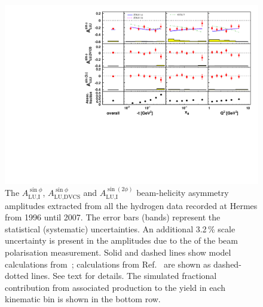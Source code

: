 \begin{figure}
 \begin{center}
 \includegraphics[width=15cm]{macros/morgan_change}
  \caption{The $A_{\textrm{LU,I}}^{\sin\phi}$, $A_{\textrm{LU,DVCS}}^{\sin\phi}$ and
$A_{\textrm{LU,I}}^{\sin(2\phi)}$ beam-helicity asymmetry amplitudes extracted from all the hydrogen data recorded at H{\sc ermes}
from 1996 until 2007. The error bars (bands) represent the statistical
(systematic) uncertainties. An additional 3.2\,\% scale uncertainty is present in the amplitudes due to the  of
the beam polarisation measurement. Solid and dashed lines show model calculations from~\cite{Kum09}; calculations from Ref.~\cite{Liu11} are shown as dashed-dotted lines. See text for details. The simulated fractional contribution from associated production to the yield in each kinematic bin is shown in the bottom row.}
  \label{bsa_xbjrange}
 \end{center}
\end{figure}


